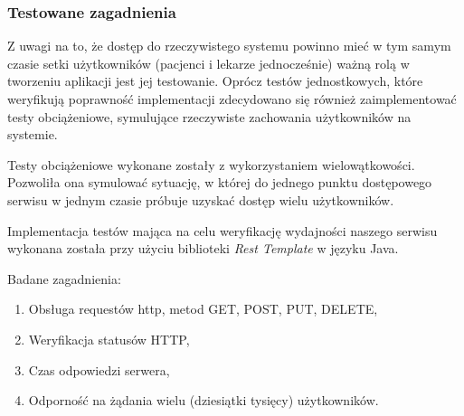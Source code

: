 \subsubsection{Testowane zagadnienia}
Z uwagi na to, że dostęp do rzeczywistego systemu powinno mieć w tym samym czasie setki użytkowników (pacjenci i lekarze jednocześnie) ważną rolą w tworzeniu aplikacji jest jej testowanie. Oprócz testów jednostkowych, które weryfikują poprawność implementacji zdecydowano się również zaimplementować testy obciążeniowe, symulujące rzeczywiste zachowania użytkowników na systemie. 

Testy obciążeniowe wykonane zostały z wykorzystaniem wielowątkowości. Pozwoliła ona symulować sytuację, w której do jednego punktu dostępowego serwisu w jednym czasie próbuje uzyskać dostęp wielu użytkowników. 

Implementacja testów mająca na celu weryfikację wydajności naszego serwisu wykonana została przy użyciu biblioteki \textit{Rest Template} w języku Java.

Badane zagadnienia:
\begin{enumerate}
\item Obsługa requestów http, metod GET, POST, PUT, DELETE,
\item Weryfikacja statusów HTTP,
\item Czas odpowiedzi serwera,
\item Odporność na żądania wielu (dziesiątki tysięcy) użytkowników.
\end{enumerate}
